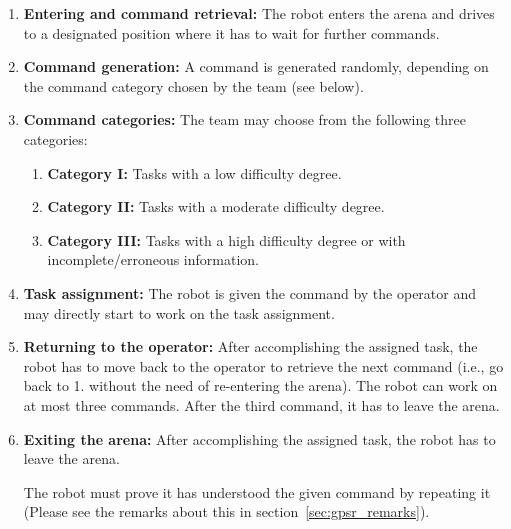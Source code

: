 \begin{enumerate}
	\item \textbf{Entering and command retrieval:} The robot enters the arena and drives to a designated position where it has to wait for further commands.

	\item \textbf{Command generation:} A command is generated randomly, depending on the command category chosen by the team (see below). \\

	\item \textbf{Command categories:} The team may choose from the following three categories:
	\begin{enumerate}
		\item \textbf{Category I:} Tasks with a low difficulty degree.
		\item \textbf{Category II:} Tasks with a moderate difficulty degree.
		\item \textbf{Category III:} Tasks with a high difficulty degree or with incomplete/erroneous information.
	\end{enumerate}

	\item \textbf{Task assignment:} The robot is given the command by the operator and may directly start to work on the task assignment.

	\item \textbf{Returning to the operator:} After accomplishing the assigned task, the robot has to move back to the operator to retrieve the next command (i.e., go back to 1. without the need of re-entering the arena). The robot can work on at most three commands. After the third command, it has to leave the arena.

	\item \textbf{Exiting the arena:} After accomplishing the assigned task, the robot has to leave the arena.

	The robot must prove it has understood the given command by repeating it (Please see the remarks about this in section~\ref{sec:gpsr_remarks}).
\end{enumerate}


